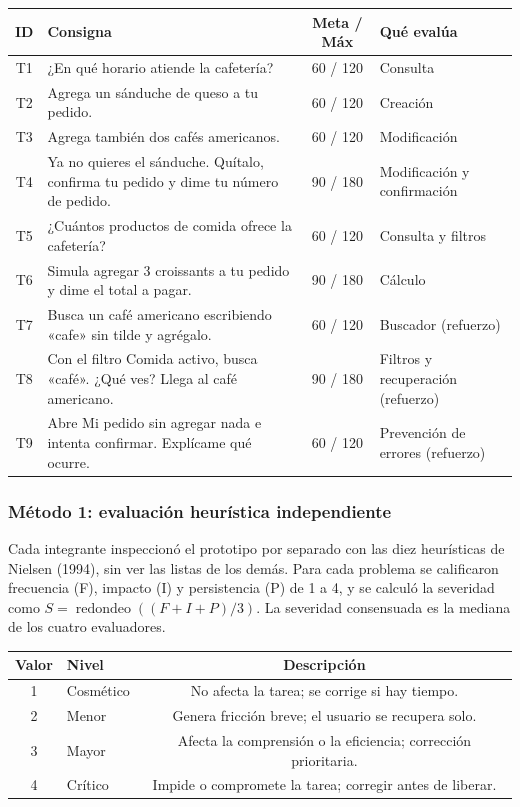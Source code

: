 \documentclass{article}
\begin{document}
\begin{center}
\small
\begin{tabular}{|c|p{7.6cm}|c|p{3.4cm}|}
\hline
\textbf{ID} & \textbf{Consigna} & \textbf{Meta / Máx} & \textbf{Qué evalúa} \\
\hline
T1 & ¿En qué horario atiende la cafetería? & 60 / 120 & Consulta \\
\hline
T2 & Agrega un sánduche de queso a tu pedido. & 60 / 120 & Creación \\
\hline
T3 & Agrega también dos cafés americanos. & 60 / 120 & Modificación \\
\hline
T4 & Ya no quieres el sánduche. Quítalo, confirma tu pedido y dime tu número de pedido. & 90 / 180 & Modificación y confirmación \\
\hline
T5 & ¿Cuántos productos de comida ofrece la cafetería? & 60 / 120 & Consulta y filtros \\
\hline
T6 & Simula agregar 3 croissants a tu pedido y dime el total a pagar. & 90 / 180 & Cálculo \\
\hline
T7 & Busca un café americano escribiendo «cafe» sin tilde y agrégalo. & 60 / 120 & Buscador (refuerzo) \\
\hline
T8 & Con el filtro Comida activo, busca «café». ¿Qué ves? Llega al café americano. & 90 / 180 & Filtros y recuperación (refuerzo) \\
\hline
T9 & Abre Mi pedido sin agregar nada e intenta confirmar. Explícame qué ocurre. & 60 / 120 & Prevención de errores (refuerzo) \\
\hline
\end{tabular}
\end{center}

\subsubsection{Método 1: evaluación heurística independiente}
Cada integrante inspeccionó el prototipo por separado con las diez heurísticas de Nielsen (1994), sin ver las listas de los demás. Para cada problema se calificaron frecuencia (F), impacto (I) y persistencia (P) de 1 a 4, y se calculó la severidad como $S = \operatorname{redondeo}((F + I + P)/3)$. La severidad consensuada es la mediana de los cuatro evaluadores.

\begin{center}
\small
\begin{tabular}{|c|p{6.2cm}|c|}
\hline
\textbf{Valor} & \textbf{Nivel} & \textbf{Descripción} \\
\hline
1 & Cosmético & No afecta la tarea; se corrige si hay tiempo. \\
\hline
2 & Menor & Genera fricción breve; el usuario se recupera solo. \\
\hline
3 & Mayor & Afecta la comprensión o la eficiencia; corrección prioritaria. \\
\hline
4 & Crítico & Impide o compromete la tarea; corregir antes de liberar. \\
\hline
\end{tabular}
\end{center}
\end{document}
